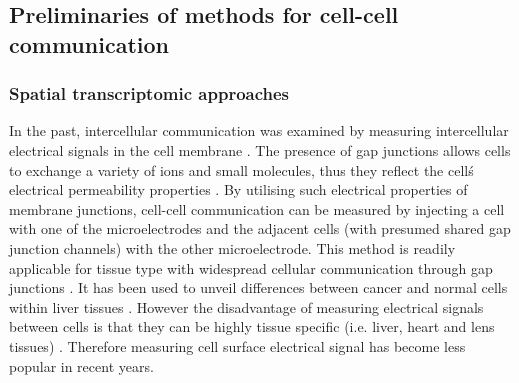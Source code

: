 \subsection{Preliminaries of methods for cell-cell communication}
\subsubsection{Spatial transcriptomic  approaches}
In the past, intercellular communication was examined by measuring intercellular electrical signals in the cell membrane \cite{bennett1966physiology, loewenstein1967intercellular, de1982cell}. The presence of gap junctions allows cells to exchange a variety of ions and small molecules, thus they reflect the cell\'s electrical permeability properties \cite{penn1966ionic, bennett1966physiology,loewenstein1966permeability,loewenstein1974cellular}. By utilising such electrical properties of membrane junctions, cell-cell communication can be measured by injecting a cell with one of the microelectrodes and the adjacent cells (with presumed shared gap junction channels) with the other microelectrode. This method is readily applicable for tissue type with widespread cellular communication through gap junctions \cite{penn1966ionic}. It has been used to unveil differences between cancer and normal cells within liver tissues \cite{loewenstein1966intercellular, loewenstein1967intercellular}. However the disadvantage of measuring electrical signals between cells is that they can be highly tissue specific (i.e. liver, heart and lens tissues) \cite{gros1983comparative}. Therefore measuring cell surface electrical signal has become less popular in recent years. 

